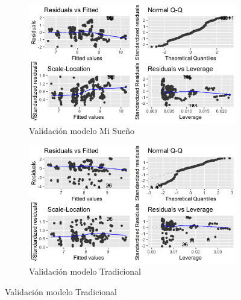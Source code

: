 \begin{figure}[H]
\centering
\label{fig:Validacion2}
\begin{subfigure}
  \centering
  \caption{Validación modelo Mi Sueño}
  \includegraphics[width=.85\linewidth]{Imagenes/log_suen.png}
\end{subfigure}%
\begin{subfigure}
  \centering
  \caption{Validación modelo Tradicional}
  \includegraphics[width=.85\linewidth]{Imagenes/log_trad.png}
\end{subfigure}
\end{figure}

\noindent 